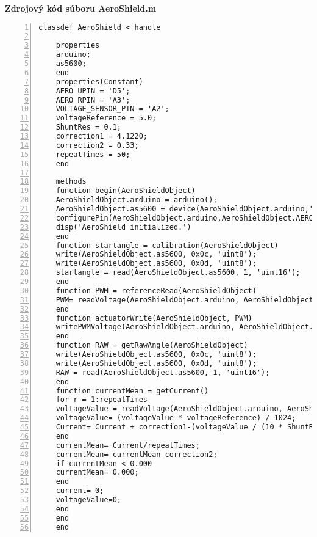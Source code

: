 \LARGE\bf{Zdrojový kód súboru AeroShield.m}
\label{AeroShield.m}
\vspace{1cm}
\begin{lstlisting}[numbers=left,basicstyle=\scriptsize,caption={Zdrojový kód súboru AeroShield.m.},captionpos=b]	
	classdef AeroShield < handle
	
	properties
	arduino;
	as5600;
	end
	properties(Constant)
	AERO_UPIN = 'D5'; 
	AERO_RPIN = 'A3';
	VOLTAGE_SENSOR_PIN = 'A2';
	voltageReference = 5.0;
	ShuntRes = 0.1;
	correction1 = 4.1220;
	correction2 = 0.33;
	repeatTimes = 50;
	end
	
	methods
	function begin(AeroShieldObject) 
	AeroShieldObject.arduino = arduino();
	AeroShieldObject.as5600 = device(AeroShieldObject.arduino,'I2CAddress',0x36); 
	configurePin(AeroShieldObject.arduino,AeroShieldObject.AERO_UPIN, 'DigitalOutput') 
	disp('AeroShield initialized.') 
	end
	function startangle = calibration(AeroShieldObject)
	write(AeroShieldObject.as5600, 0x0c, 'uint8');
	write(AeroShieldObject.as5600, 0x0d, 'uint8');
	startangle = read(AeroShieldObject.as5600, 1, 'uint16');
	end
	function PWM = referenceRead(AeroShieldObject)
	PWM= readVoltage(AeroShieldObject.arduino, AeroShieldObject.AERO_RPIN);
	end
	function actuatorWrite(AeroShieldObject, PWM) 
	writePWMVoltage(AeroShieldObject.arduino, AeroShieldObject.AERO_UPIN, PWM);
	end
	function RAW = getRawAngle(AeroShieldObject)
	write(AeroShieldObject.as5600, 0x0c, 'uint8');
	write(AeroShieldObject.as5600, 0x0d, 'uint8');
	RAW = read(AeroShieldObject.as5600, 1, 'uint16');
	end
	function currentMean = getCurrent()
	for r = 1:repeatTimes
	voltageValue = readVoltage(AeroShieldObject.arduino, AeroShieldObject.VOLTAGE_SENSOR_PIN);
	voltageValue= (voltageValue * voltageReference) / 1024;
	Current= Current + correction1-(voltageValue / (10 * ShuntRes)); 
	end
	currentMean= Current/repeatTimes;
	currentMean= currentMean-correction2;
	if currentMean < 0.000 
	currentMean= 0.000; 
	end
	current= 0;  
	voltageValue=0;   
	end 
	end
	end
\end{lstlisting}